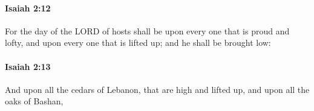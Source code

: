 		\paragraph{Isaiah 2:12} %
			\label{ISAIAH-2-12}

			For the day of the LORD of hosts shall be upon every one that is proud and lofty, and upon every one that is lifted up; and he shall be brought low:


		\paragraph{Isaiah 2:13} %
			\label{ISAIAH-2-13}

			And upon all the cedars of Lebanon, that are high and lifted up, and upon all the oaks of Bashan,


